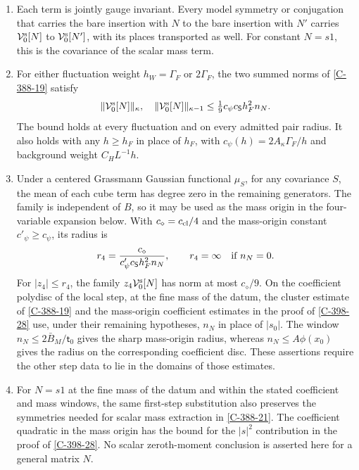 \documentclass[11pt,letterpaper,reqno]{amsart}
\makeatletter
\theoremstyle{definition}
\newcommand{\ms@minorstart}{%
  \pushQED{\qed}\renewcommand{\qedsymbol}{$\blacksquare$}}
\newenvironment{lemma}[1][]{\ms@minorstart\ms@lemma[#1]}
  {\popQED\endms@lemma}
\theoremstyle{remark}
\makeatother
\begin{document}
\begin{lemma}[The mass insertion at the first step]
\begin{enumerate}
\item[(iii)]
Each term is jointly gauge invariant.  Every model symmetry or
conjugation that carries the bare insertion with $N$ to the bare
insertion with $N'$ carries $\mathcal V^{\rm s}_0[N]$ to
$\mathcal V^{\rm s}_0[N']$, with its places transported as well.
For constant $N=s1$, this is the covariance of the scalar mass term.

\item[(iv)]
For either fluctuation weight $h_W=\Gamma_F$ or $2\Gamma_F$, the
two summed norms of \cref{C-388-19} satisfy
\begin{equation}\label{eq:qcd-first-mass-size}
 \|\mathcal V^{\rm s}_0[N]\|_\kappa,\quad
 \|\mathcal V^{\rm s}_0[N]\|_{\kappa-1}
 \le\tfrac19c_\psi c_{\mathsf S}h_F^2n_N.
\end{equation}
The bound holds at every fluctuation and on every admitted pair
radius.  It also holds with any $h\ge h_F$ in place of $h_F$,
with $c_\psi(h)=2A_\kappa\Gamma_F/h$ and background weight
$C_HL^{-1}h$.

\item[(v)]
Under a centered Grassmann Gaussian functional $\mu_S$, for any
covariance $S$, the mean of each cube term has degree zero in the
remaining generators.  The family is independent of $B$, so it may
be used as the mass origin in the four-variable expansion below.
With $c_\diamond=c_{\rm cl}/4$ and the mass-origin constant
$c'_\psi\ge c_\psi$, its radius is
\begin{equation}\label{eq:qcd-first-mass-radius}
 r_4=\frac{c_\diamond}{c'_\psi c_{\mathsf S}h_F^2n_N},
 \qquad r_4=\infty\quad\hbox{if }n_N=0.
\end{equation}
For $|z_4|\le r_4$, the family $z_4\mathcal V^{\rm s}_0[N]$
has norm at most $c_\diamond/9$.
On the coefficient polydisc of the local step, at the fine mass
of the datum, the cluster estimate of \cref{C-388-19} and the
mass-origin coefficient estimates in the proof of \cref{C-398-28}
use, under their remaining hypotheses,
$n_N$ in place of $|s_0|$.  The window
$n_N\le2\bar B_M/\mathsf t_0$ gives the sharp mass-origin radius,
whereas $n_N\le A\phi(x_0)$ gives the radius on the corresponding
coefficient disc.  These assertions require the other step data
to lie in the domains of those estimates.

\item[(vi)]
For $N=s1$ at the fine mass of the datum and within the stated
coefficient and mass windows, the same first-step substitution
also preserves the symmetries needed for scalar mass extraction
in \cref{C-388-21}.  The coefficient quadratic in the mass origin
has the bound for the $|s|^2$ contribution in the proof of
\cref{C-398-28}.  No scalar
zeroth-moment conclusion is asserted here for a general matrix $N$.
\end{enumerate}
\end{lemma}
\end{document}
